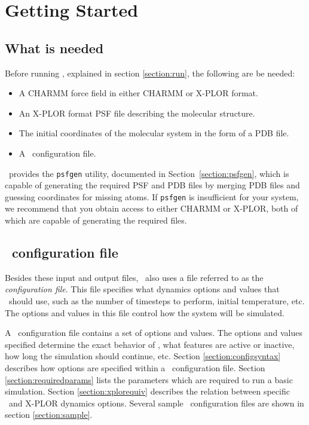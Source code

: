 
\section{Getting Started}
\label{section:start}

\subsection{What is needed}

Before running \NAMD, explained in section \ref{section:run}, 
the following are be needed:
\begin{itemize}
\item A CHARMM force field in either CHARMM or X-PLOR format.
\item
An X-PLOR format PSF file describing the molecular structure.
\item
The initial coordinates of the molecular system in the form of a PDB file.  
\item
A \NAMD\ configuration file.
\end{itemize}

\NAMD\ provides the \verb#psfgen# utility,
documented in Section~\ref{section:psfgen},
which is capable of generating the required PSF and PDB files by
merging PDB files and guessing coordinates for missing atoms.
If \verb#psfgen# is insufficient for your system,
we recommend that you obtain access to either CHARMM or X-PLOR,
both of which are capable of generating the required files.

\subsection{\NAMD\ configuration file}
\label{section:config}

Besides these input and output files, \NAMD\ also uses 
a file referred to as the {\it configuration file\/}.  
This file specifies what dynamics options and values that 
\NAMD\ should use, such as the number of timesteps to perform, 
initial temperature, etc.  
The options and values in this file control how 
the system will be simulated.  

A \NAMD\ configuration file contains a set of options and values.  
The options and values specified determine the exact behavior of
\NAMD, what features are active or inactive, how long the simulation
should continue, etc.  Section \ref{section:configsyntax} describes how
options are specified within a \NAMD\ configuration file.  Section
\ref{section:requiredparams} lists the parameters which are required
to run a basic simulation.  Section \ref{section:xplorequiv}
describes the relation between specific \NAMD\ and X-PLOR dynamics
options.  Several sample \NAMD\ configuration files are shown
in section \ref{section:sample}.


